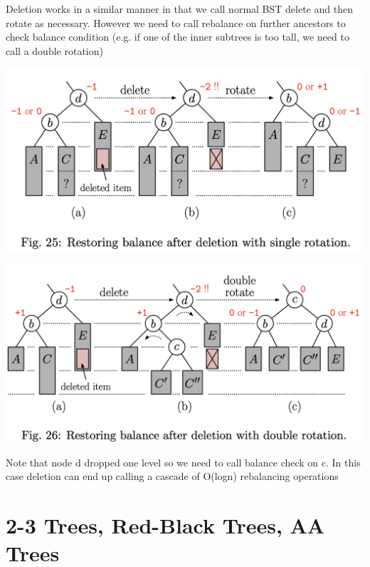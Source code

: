 \documentclass{article}
\begin{document}
  Deletion works in a similar manner in that we call normal BST delete and then rotate as necessary. However we need to call rebalance on further ancestors to check balance condition (e.g. if one of the inner subtrees is too tall, we need to call a double rotation)
  \begin{center}
  \includegraphics[scale=0.4]{AVLSingleRotationDeletion}
  \end{center}
  \begin{center}
  \includegraphics[scale=0.4]{AVLDoubleRotationDeletion}
  \end{center}
  Note that node d dropped one level so we need to call balance check on c. In this case deletion can end up calling a cascade of O(logn) rebalancing operations
  \newpage 
  \section{2-3 Trees, Red-Black Trees, AA Trees}
\end{document}
